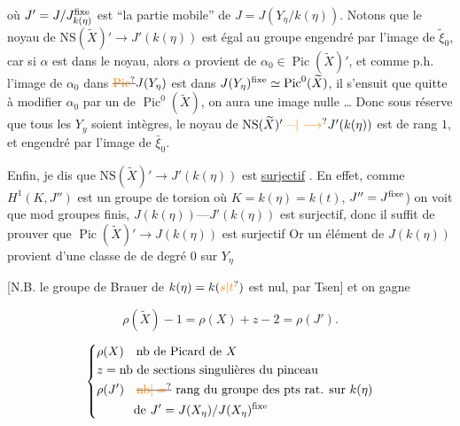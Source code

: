 où $J'=J/J^{\rm fixe}_{k(\eta)}$ est ``la partie mobile'' de $J=
J(Y_\eta/k(\eta))$. Notons que le noyau de
$\mathrm{NS}(\widetilde X)'\longrightarrow J'(k(\eta))$ est égal au groupe engendré
par l’image de $\tilde\xi_0$, car si $\alpha$ est
dans le noyau, alors $\alpha$ provient de
$\alpha_0\in\operatorname{Pic}(\widetilde X)'$, et comme p.h. l’image de
$\alpha_0$ dans $\deleted{\unsure{\operatorname{Pic}}}J(Y_\eta)$ est dans $J(Y_\eta)^{\rm fixe}\simeq\operatorname{Pic}^0(\widetilde X)$,
il s’ensuit que quitte à modifier $\alpha_0$ par
un  de $\operatorname{Pic}^0(\widetilde X)$, on aura une
image nulle \ldots{} Donc sous réserve
que tous les $Y_y$ soient intègres, le
noyau de $\mathrm{NS}(\widetilde X)'\unsure{\text{---}|\longrightarrow}J'(k(\eta))$ est
de rang $1$, et engendré par l’image de $\bar\xi_0$.

Enfin, je dis que  $\mathrm{NS}(\widetilde X)'\longrightarrow J'(k(\eta))$
est \uline{surjectif} . En effet,  comme $H^1(K,J'')$ est un
groupe de torsion \unsure{[|$T$} où $K=k(\eta)=k(t)$,
$J''=J^{\rm fixe}$) on voit que mod groupes finis,
 $J(k(\eta))\text{---}J'(k(\eta))$ est
surjectif, donc il suffit de prouver
que $\operatorname{Pic}(\widetilde X)'\longrightarrow J(k(\eta))$ est surjectif 
 Or un élément de
$J(k(\eta))$  provient  d’une classe de
 de degré $0$ sur $Y_\eta$

[N.B. le groupe de Brauer de $k(\eta)=k(\unsure{s|t})$
est nul, par Tsen] et on gagne

\[
 \boxed{\rho(\widetilde X)-1=}\boxed{\rho(X)+z-2=\rho(J')}.
\]

\[
\left\{\begin{aligned}
&\rho(X)\quad\text{nb de Picard de }X\\
&z=\text{nb de sections singulières du pinceau}\\
&\rho(J')\quad\deleted{\unsure{\mathrm{nb}|=}}\ \text{rang du groupe des pts rat. sur }k(\eta)\\
&\hspace{3em}\text{de }J'=J(X_\eta)/J(X_\eta)^{\rm fixe}
\end{aligned}\right.
\]

